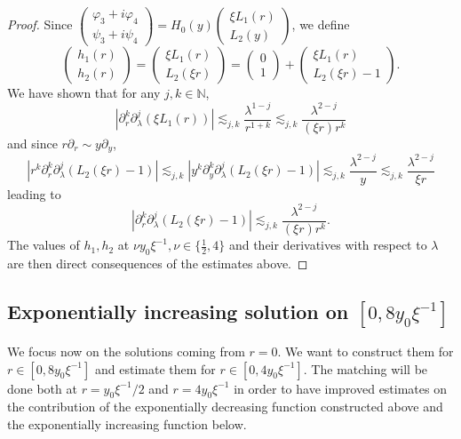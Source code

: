 \documentclass[11 pt]{amsart}
\theoremstyle{definition}
\theoremstyle{remark}
\numberwithin{equation}{section}
\begin{document}
\begin{proof}
  Since $\left(\begin{array}{c}
    \varphi_3 + i \varphi_4\\
    \psi_3 + i \psi_4
  \end{array}\right) = H_0 (y) \left(\begin{array}{c}
    \xi L_1 (r)\\
    L_2 (y)
  \end{array}\right)$, we define
  \[ \  \]
  \[ \left(\begin{array}{c}
       h_1 (r)\\
       h_2 (r)
     \end{array}\right) = \left(\begin{array}{c}
       \xi L_1 (r)\\
       L_2 (\xi r)
     \end{array}\right) = \left(\begin{array}{c}
       0\\
       1
     \end{array}\right) + \left(\begin{array}{c}
       \xi L_1 (r)\\
       L_2 (\xi r) - 1
     \end{array}\right) . \]
  We have shown that for any $j, k \in \mathbb{N}$,
  \[ | \partial_r^k \partial_{\lambda}^j (\xi L_1 (r)) | \lesssim_{j, k}
     \frac{\lambda^{1 - j}}{r^{1 + k}} \lesssim_{j, k} \frac{\lambda^{2 -
     j}}{(\xi r) r^k} \]
  and since $r \partial_r \sim y \partial_y$,
  \[ | r^k \partial_r^k \partial_{\lambda}^j (L_2 (\xi r) - 1) | \lesssim_{j,
     k} | y^k \partial_y^k \partial_{\lambda}^j (L_2 (\xi r) - 1) |
     \lesssim_{j, k} \frac{\lambda^{2 - j}}{y} \lesssim_{j, k}
     \frac{\lambda^{2 - j}}{\xi r} \]
  leading to
  \[ | \partial_r^k \partial_{\lambda}^j (L_2 (\xi r) - 1) | \lesssim_{j, k}
     \frac{\lambda^{2 - j}}{(\xi r) r^k} . \]
  The values of $h_1, h_2$ at $\nu y_0 \xi^{- 1}, \nu \in \{ \frac 12, 4 \}$ and their
  derivatives with respect to $\lambda$ are then direct consequences of the estimates above.
\end{proof}

\subsection{Exponentially increasing solution on $[0, 8 y_0 \xi^{- 1}]$}

We focus now on the solutions coming from $r=0$. We want to construct them for $r\in[0,8y_0\xi^{-1}]$ and estimate them for $r\in[0,4y_0\xi^{-1}]$. The matching will be done both at $r=y_0\xi^{-1}/2$ and $r=4y_0\xi^{-1}$ in order to have improved estimates on the contribution of the exponentially decreasing function constructed above and the exponentially increasing function below. 
\end{document}
